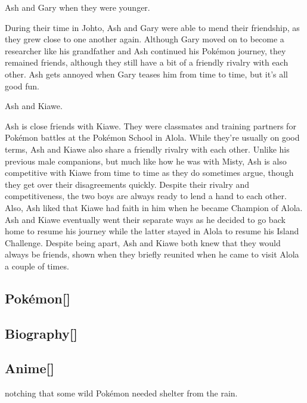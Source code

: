 \documentclass[a4paper,12pt]{article}
\begin{document}
Ash and Gary when they were younger.\\ \par \vspace{0.5cm}

During their time in Johto, Ash and Gary were able to mend their friendship, as they grew close to one another again. Although Gary moved on to become a researcher like his grandfather and Ash continued his Pokémon journey, they remained friends, although they still have a bit of a friendly rivalry with each other. Ash gets annoyed when Gary teases him from time to time, but it's all good fun.\\ \par \vspace{0.5cm}

Ash and Kiawe.\\ \par \vspace{0.5cm}

Ash is close friends with Kiawe. They were classmates and training partners for Pokémon battles at the Pokémon School in Alola. While they're usually on good terms, Ash and Kiawe also share a friendly rivalry with each other. Unlike his previous male companions, but much like how he was with Misty, Ash is also competitive with Kiawe from time to time as they do sometimes argue, though they get over their disagreements quickly. Despite their rivalry and competitiveness, the two boys are always ready to lend a hand to each other. Also, Ash liked that Kiawe had faith in him when he became Champion of Alola. Ash and Kiawe eventually went their separate ways as he decided to go back home to resume his journey while the latter stayed in Alola to resume his Island Challenge. Despite being apart, Ash and Kiawe both knew that they would always be friends, shown when they briefly reunited when he came to visit Alola a couple of times.\\ \par \vspace{0.5cm}

\subsection*{Pokémon[]}\n\n\subsection*{Biography[]}\n\n\subsection*{Anime[]}\n\nAsh notching that some wild Pokémon needed shelter from the rain.\\ \par \vspace{0.5cm}
\end{document}
